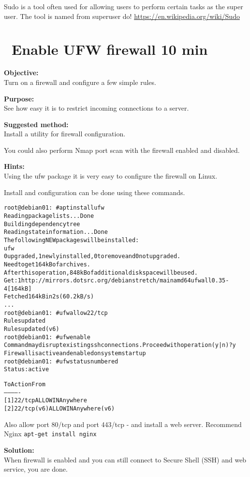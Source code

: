 \documentclass[a4paper,11pt,notitlepage]{report}
\begin{document}
Sudo is a tool often used for allowing users to perform certain tasks as the super user. The tool is named from superuser do! \url{https://en.wikipedia.org/wiki/Sudo}


\chapter{\faInfoCircle\ Enable UFW firewall 10 min}
\label{ex:debian-firewall}

{\bf Objective:}\\
Turn on a firewall and configure a few simple rules.

{\bf Purpose:}\\
See how easy it is to restrict incoming connections to a server.


{\bf Suggested method:}\\
Install a utility for firewall configuration.

You could also perform Nmap port scan with the firewall enabled and disabled.

{\bf Hints:}\\
Using the ufw package it is very easy to configure the firewall on Linux.

Install and configuration can be done using these commands.
\begin{alltt}
root@debian01:~# apt install ufw
Reading package lists... Done
Building dependency tree
Reading state information... Done
The following NEW packages will be installed:
  ufw
0 upgraded, 1 newly installed, 0 to remove and 0 not upgraded.
Need to get 164 kB of archives.
After this operation, 848 kB of additional disk space will be used.
Get:1 http://mirrors.dotsrc.org/debian stretch/main amd64 ufw all 0.35-4 [164 kB]
Fetched 164 kB in 2s (60.2 kB/s)
...
root@debian01:~# ufw allow 22/tcp
Rules updated
Rules updated (v6)
root@debian01:~# ufw enable
Command may disrupt existing ssh connections. Proceed with operation (y|n)? y
Firewall is active and enabled on system startup
root@debian01:~# ufw status numbered
Status: active

     To                         Action      From
     --                         ------      ----
[ 1] 22/tcp                     ALLOW IN    Anywhere
[ 2] 22/tcp (v6)                ALLOW IN    Anywhere (v6)
\end{alltt}

Also allow port 80/tcp and port 443/tcp - and install a web server. Recommend Nginx \verb+apt-get install nginx+

{\bf Solution:}\\
When firewall is enabled and you can still connect to Secure Shell (SSH) and web service, you are done.
\end{document}
